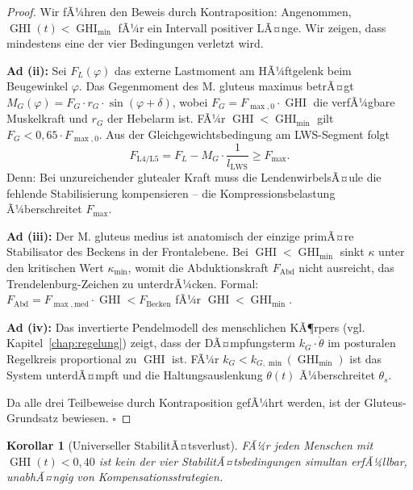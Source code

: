 ﻿\documentclass[12pt,a4paper]{report}
\theoremstyle{plain}
\newtheorem{korollar}[theorem]{Korollar}
\theoremstyle{definition}
\theoremstyle{remark}
\DeclareMathOperator{\GHI}{GHI}
\begin{document}
	\begin{proof}
		Wir fÃ¼hren den Beweis durch Kontraposition: Angenommen, $\GHI(t) < \GHI_{\min}$
		fÃ¼r ein Intervall positiver LÃ¤nge. Wir zeigen, dass mindestens eine der
		vier Bedingungen verletzt wird.
		
		\textbf{Ad (ii):} Sei $F_L(\varphi)$ das externe Lastmoment am HÃ¼ftgelenk
		beim Beugewinkel $\varphi$. Das Gegenmoment des M. gluteus maximus betrÃ¤gt
		$M_G(\varphi) = F_G \cdot r_G \cdot \sin(\varphi + \delta)$,
		wobei $F_G = F_{\max,0} \cdot \GHI$ die verfÃ¼gbare Muskelkraft und
		$r_G$ der Hebelarm ist.
		FÃ¼r $\GHI < \GHI_{\min}$ gilt $F_G < 0{,}65 \cdot F_{\max,0}$.
		Aus der Gleichgewichtsbedingung am LWS-Segment folgt
		\[
		F_{\mathrm{L4/L5}} = F_L - M_G \cdot \frac{1}{l_{\mathrm{LWS}}} \geq F_{\max}.
		\]
		Denn: Bei unzureichender glutealer Kraft muss die LendenwirbelsÃ¤ule
		die fehlende Stabilisierung kompensieren -- die Kompressionsbelastung
		Ã¼berschreitet $F_{\max}$.
		
		\textbf{Ad (iii):} Der M. gluteus medius ist anatomisch der einzige
		primÃ¤re Stabilisator des Beckens in der Frontalebene.
		Bei $\GHI < \GHI_{\min}$ sinkt $\kappa$ unter den kritischen Wert
		$\kappa_{\min}$, womit die Abduktionskraft $F_{\mathrm{Abd}}$ nicht
		ausreicht, das Trendelenburg-Zeichen zu unterdrÃ¼cken. Formal:
		$F_{\mathrm{Abd}} = F_{\max,\mathrm{med}} \cdot \GHI < F_{\mathrm{Becken}}$
		fÃ¼r $\GHI < \GHI_{\min}$.
		
		\textbf{Ad (iv):} Das invertierte Pendelmodell des menschlichen KÃ¶rpers
		(vgl. Kapitel~\ref{chap:regelung}) zeigt, dass der DÃ¤mpfungsterm
		$k_G \cdot \dot\theta$ im posturalen Regelkreis proportional zu $\GHI$
		ist. FÃ¼r $k_G < k_{G,\min}(\GHI_{\min})$ ist das System unterdÃ¤mpft
		und die Haltungsauslenkung $\theta(t)$ Ã¼berschreitet $\theta_s$.
		
		Da alle drei Teilbeweise durch Kontraposition gefÃ¼hrt werden,
		ist der Gluteus-Grundsatz bewiesen. \hfill$\square$
	\end{proof}
	
	\begin{korollar}[Universeller StabilitÃ¤tsverlust]
		FÃ¼r jeden Menschen mit $\GHI(t) < 0{,}40$ ist kein der vier StabilitÃ¤tsbedingungen
		simultan erfÃ¼llbar, unabhÃ¤ngig von Kompensationsstrategien.
	\end{korollar}
	
\end{document}
